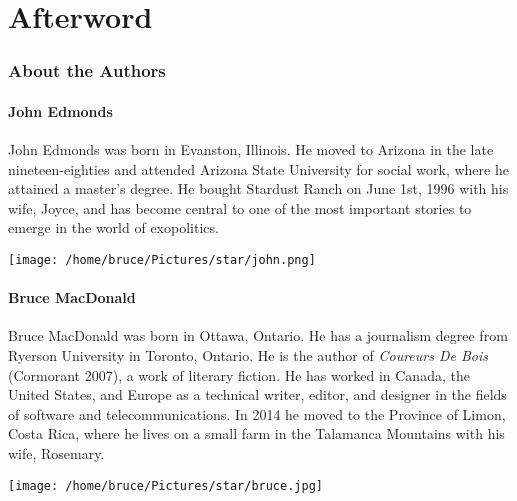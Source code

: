 \documentclass[letterpaper,11pt,twoside,titlepage,onecolumn,openany]{book}
\begin{document}




\part{Afterword}




\newpage
\thispagestyle{empty}

\begin{center}

\section*{About the Authors}

\end{center}

\subsection*{John Edmonds}

\vspace{20mm}
\noindent
John Edmonds was born in Evanston, Illinois. He moved to Arizona in the late nineteen-eighties and attended Arizona State University for social work, where he attained a master's degree. He bought Stardust Ranch on June 1st, 1996 with his wife, Joyce, and has become central to one of the most important stories to emerge in the world of exopolitics.

\begin{center}


\texttt{[image: /home/bruce/Pictures/star/john.png]}

\end{center}


\newpage
\subsection*{Bruce MacDonald}

\vspace{20mm}
\noindent
Bruce MacDonald was born in Ottawa, Ontario. He has a journalism degree from Ryerson University in Toronto, Ontario. He is the author of \textit{Coureurs De Bois} (Cormorant 2007), a work of literary fiction. He has worked in Canada, the United States, and Europe as a technical writer, editor, and designer in the fields of software and telecommunications. In 2014 he moved to the Province of Limon, Costa Rica, where he lives on a small farm in the Talamanca Mountains with his wife, Rosemary.

\begin{center}


\texttt{[image: /home/bruce/Pictures/star/bruce.jpg]}

\end{center}
\end{document}
